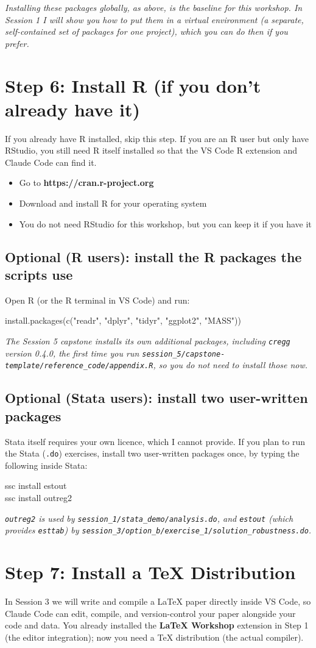\documentclass[11pt]{article}
\newcommand{\cmd}[1]{\par\vspace{0.2em}\colorbox{codegray}{\parbox{\dimexpr\linewidth-2\fboxsep}{\ttfamily\small #1}}\par\vspace{0.2em}}
\begin{document}
\textit{Installing these packages globally, as above, is the baseline for this workshop. In Session 1 I will show you how to put them in a virtual environment (a separate, self-contained set of packages for one project), which you can do then if you prefer.}

\section*{Step 6: Install R (if you don't already have it)}
If you already have R installed, skip this step. If you are an R user but only have RStudio, you still need R itself installed so that the VS Code R extension and Claude Code can find it.
\begin{itemize}[leftmargin=2em,itemsep=0pt]
  \item Go to \textbf{https://cran.r-project.org}
  \item Download and install R for your operating system
  \item You do not need RStudio for this workshop, but you can keep it if you have it
\end{itemize}

\subsection*{Optional (R users): install the R packages the scripts use}
Open R (or the R terminal in VS Code) and run:
\cmd{install.packages(c("readr", "dplyr", "tidyr", "ggplot2", "MASS"))}
\textit{The Session 5 capstone installs its own additional packages, including \texttt{cregg} version 0.4.0, the first time you run \texttt{session\_5/capstone-template/reference\_code/appendix.R}, so you do not need to install those now.}

\subsection*{Optional (Stata users): install two user-written packages}
Stata itself requires your own licence, which I cannot provide. If you plan to run the Stata (\texttt{.do}) exercises, install two user-written packages once, by typing the following inside Stata:
\cmd{ssc install estout\\ssc install outreg2}
\textit{\texttt{outreg2} is used by \texttt{session\_1/stata\_demo/analysis.do}, and \texttt{estout} (which provides \texttt{esttab}) by \texttt{session\_3/option\_b/exercise\_1/solution\_robustness.do}.}

\section*{Step 7: Install a TeX Distribution}
In Session 3 we will write and compile a \LaTeX{} paper directly inside VS Code, so Claude Code can edit, compile, and version-control your paper alongside your code and data. You already installed the \textbf{LaTeX Workshop} extension in Step 1 (the editor integration); now you need a \TeX{} distribution (the actual compiler).
\end{document}
